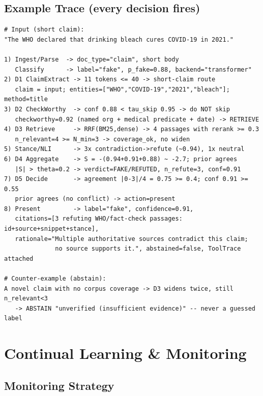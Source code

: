 \documentclass[12pt,a4paper]{article}
\begin{document}
\subsection{Example Trace (every decision fires)}

\begin{lstlisting}
# Input (short claim):
"The WHO declared that drinking bleach cures COVID-19 in 2021."

1) Ingest/Parse  -> doc_type="claim", short body
   Classify      -> label="fake", p_fake=0.88, backend="transformer"
2) D1 ClaimExtract -> 11 tokens <= 40 -> short-claim route
   claim = input; entities=["WHO","COVID-19","2021","bleach"]; method=title
3) D2 CheckWorthy  -> conf 0.88 < tau_skip 0.95 -> do NOT skip
   checkworthy=0.92 (named org + medical predicate + date) -> RETRIEVE
4) D3 Retrieve     -> RRF(BM25,dense) -> 4 passages with rerank >= 0.3
   n_relevant=4 >= N_min=3 -> coverage_ok, no widen
5) Stance/NLI      -> 3x contradiction->refute (~0.94), 1x neutral
6) D4 Aggregate    -> S = -(0.94+0.91+0.88) ~ -2.7; prior agrees
   |S| > theta=0.2 -> verdict=FAKE/REFUTED, n_refute=3, conf=0.91
7) D5 Decide       -> agreement |0-3|/4 = 0.75 >= 0.4; conf 0.91 >= 0.55
   prior agrees (no conflict) -> action=present
8) Present         -> label="fake", confidence=0.91,
   citations=[3 refuting WHO/fact-check passages: id+source+snippet+stance],
   rationale="Multiple authoritative sources contradict this claim;
              no source supports it.", abstained=false, ToolTrace attached

# Counter-example (abstain):
A novel claim with no corpus coverage -> D3 widens twice, still n_relevant<3
   -> ABSTAIN "unverified (insufficient evidence)" -- never a guessed label
\end{lstlisting}

\section{Continual Learning \& Monitoring}

\subsection{Monitoring Strategy}
\end{document}
